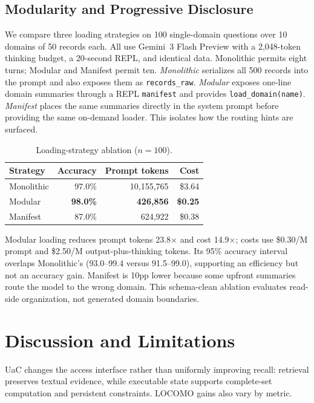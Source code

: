 \subsection{Modularity and Progressive Disclosure}
\label{sec:modularity}

We compare three loading strategies on 100 single-domain questions over 10 domains of 50 records each. All use Gemini~3 Flash Preview with a 2,048-token thinking budget, a 20-second REPL, and identical data. Monolithic permits eight turns; Modular and Manifest permit ten. \emph{Monolithic} serializes all 500 records into the prompt and also exposes them as \texttt{records\_raw}. \emph{Modular} exposes one-line domain summaries through a REPL \texttt{manifest} and provides \texttt{load\_domain(name)}. \emph{Manifest} places the same summaries directly in the system prompt before providing the same on-demand loader. This isolates how the routing hints are surfaced.

\begin{table}[t]
\centering
\caption{Loading-strategy ablation ($n=100$).}
\label{tab:modularity}
\small
\setlength{\tabcolsep}{3pt}
\begin{tabular}{@{}lrrr@{}}
\toprule
Strategy & Accuracy & Prompt tokens & Cost \\
\midrule
Monolithic & 97.0\% & 10,155,765 & \$3.64 \\
Modular & \textbf{98.0\%} & \textbf{426,856} & \textbf{\$0.25} \\
Manifest & 87.0\% & 624,922 & \$0.38 \\
\bottomrule
\end{tabular}
\end{table}

Modular loading reduces prompt tokens 23.8$\times$ and cost 14.9$\times$; costs use \$0.30/M prompt and \$2.50/M output-plus-thinking tokens. Its 95\% accuracy interval overlaps Monolithic's (93.0--99.4 versus 91.5--99.0), supporting an efficiency but not an accuracy gain. Manifest is 10pp lower because some upfront summaries route the model to the wrong domain. This schema-clean ablation evaluates read-side organization, not generated domain boundaries.

\section{Discussion and Limitations}

UaC changes the access interface rather than uniformly improving recall: retrieval preserves textual evidence, while executable state supports complete-set computation and persistent constraints. LOCOMO gains also vary by metric.

